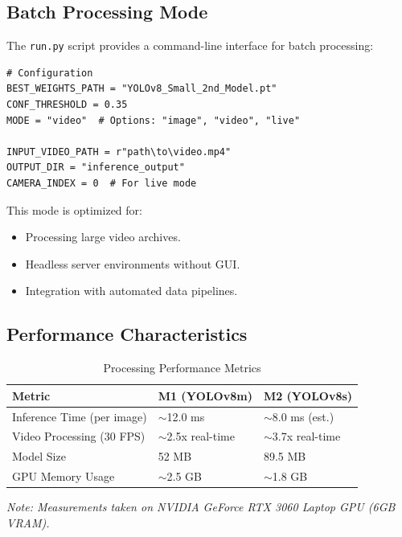 \documentclass[12pt]{article}
\begin{document}
\subsection{Batch Processing Mode}

The \texttt{run.py} script provides a command-line interface for batch processing:

\begin{lstlisting}[caption={Batch Processing Configuration}, label={lst:batch-config}]
# Configuration
BEST_WEIGHTS_PATH = "YOLOv8_Small_2nd_Model.pt"
CONF_THRESHOLD = 0.35
MODE = "video"  # Options: "image", "video", "live"

INPUT_VIDEO_PATH = r"path\to\video.mp4"
OUTPUT_DIR = "inference_output"
CAMERA_INDEX = 0  # For live mode
\end{lstlisting}

This mode is optimized for:

\begin{itemize}
    \item Processing large video archives.
    \item Headless server environments without GUI.
    \item Integration with automated data pipelines.
\end{itemize}

\subsection{Performance Characteristics}

\begin{table}[H]
    \centering
    \caption{Processing Performance Metrics}
    \label{tab:performance}
    \begin{tabular}{lll}
        \toprule
        \textbf{Metric} & \textbf{M1 (YOLOv8m)} & \textbf{M2 (YOLOv8s)} \\
        \midrule
        Inference Time (per image) & $\sim$12.0 ms & $\sim$8.0 ms (est.) \\
        Video Processing (30 FPS) & $\sim$2.5x real-time & $\sim$3.7x real-time \\
        Model Size & 52 MB & 89.5 MB \\
        GPU Memory Usage & $\sim$2.5 GB & $\sim$1.8 GB \\
        \bottomrule
    \end{tabular}
\end{table}

\textit{Note: Measurements taken on NVIDIA GeForce RTX 3060 Laptop GPU (6GB VRAM).}
\end{document}
